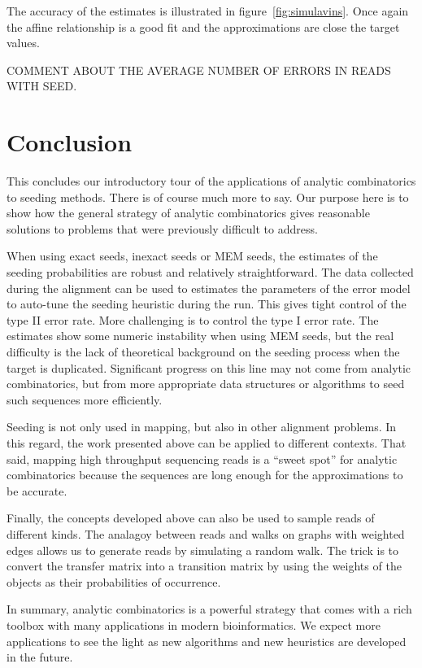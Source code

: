 \documentclass{article}
\begin{document}
The accuracy of the estimates is illustrated in
figure~\ref{fig:simulavins}. Once again the affine relationship is a good
fit and the approximations are close the target values.


COMMENT ABOUT THE AVERAGE NUMBER OF ERRORS IN READS WITH SEED.



\section{Conclusion}

This concludes our introductory tour of the applications of analytic
combinatorics to seeding methods. There is of course much more to say. Our
purpose here is to show how the general strategy of analytic combinatorics
gives reasonable solutions to problems that were previously difficult to
address.

When using exact seeds, inexact seeds or MEM seeds, the estimates of the
seeding probabilities are robust and relatively straightforward. The data
collected during the alignment can be used to estimates the parameters of
the error model to auto-tune the seeding heuristic during the run. This
gives tight control of the type II error rate. More challenging is to
control the type I error rate. The estimates show some numeric instability
when using MEM seeds, but the real difficulty is the lack of theoretical
background on the seeding process when the target is duplicated.
Significant progress on this line may not come from analytic
combinatorics, but from more appropriate data structures or algorithms to
seed such sequences more efficiently.

Seeding is not only used in mapping, but also in other alignment problems.
In this regard, the work presented above can be applied to different
contexts. That said, mapping high throughput sequencing reads is a ``sweet
spot'' for analytic combinatorics because the sequences are long enough
for the approximations to be accurate.

Finally, the concepts developed above can also be used to sample reads of
different kinds. The analagoy between reads and walks on graphs with
weighted edges allows us to generate reads by simulating a random walk.
The trick is to convert the transfer matrix into a transition matrix by
using the weights of the objects as their probabilities of occurrence.

In summary, analytic combinatorics is a powerful strategy that comes with
a rich toolbox with many applications in modern bioinformatics. We expect
more applications to see the light as new algorithms and new heuristics
are developed in the future.









\end{document}
